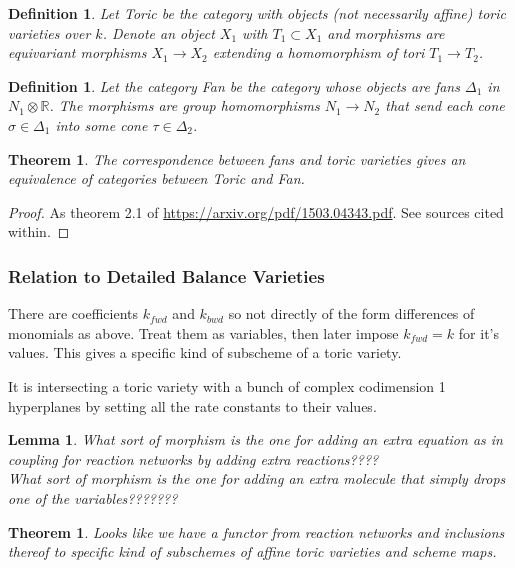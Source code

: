 \documentclass[11pt]{book}
\theoremstyle{change}
\newtheorem{definition}[equation]{Definition}
\newtheorem{thm}[equation]{Theorem}
\newtheorem{theorem}[equation]{Theorem}
\newtheorem{lemma}[equation]{Lemma}
\theoremstyle{nonumberplain}
\newtheorem{proof}{Proof}
\numberwithin{equation}{section}
\begin{document}
\begin{definition}
Let Toric be the category with objects (not necessarily affine) toric varieties over $k$. Denote an object $X_1$ with $T_1 \subset X_1$ and morphisms are equivariant morphisms $X_1 \to X_2$ extending a homomorphism of tori $T_1 \to T_2$.
\end{definition}

\begin{definition}
Let the category Fan be the category whose objects are fans $\Delta_1$ in $N_1 \otimes \mathbb{R}$. The morphisms are group homomorphisms $N_1 \to N_2$ that send each cone $\sigma \in \Delta_1$ into some cone $\tau \in \Delta_2$.
\end{definition}

\begin{theorem}
The correspondence between fans and toric varieties gives an equivalence of categories between Toric and Fan.
\end{theorem}

\begin{proof}
As theorem 2.1 of \url{https://arxiv.org/pdf/1503.04343.pdf}. See sources cited within.
\end{proof}

\subsubsection{Relation to Detailed Balance Varieties}

There are coefficients $k_{fwd}$ and $k_{bwd}$ so not directly of the form differences of monomials as above. Treat them as variables, then later impose $k_{fwd} = k$ for it's values. This gives a specific kind of subscheme of a toric variety.

It is intersecting a toric variety with a bunch of complex codimension 1 hyperplanes by setting all the rate constants to their values.

\begin{lemma}
What sort of morphism is the one for adding an extra equation as in coupling for reaction networks by adding extra reactions????\\
What sort of morphism is the one for adding an extra molecule that simply drops one of the variables???????\\
\end{lemma}

\begin{thm}
Looks like we have a functor from reaction networks and inclusions thereof to specific kind of subschemes of affine toric varieties and scheme maps.
\end{thm}
\end{document}
